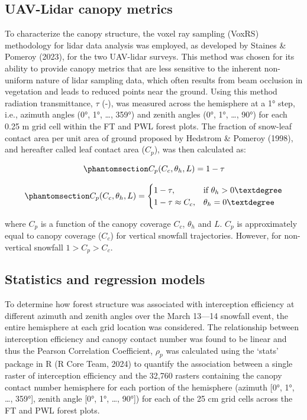 \documentclass[
  letterpaper,
  DIV=11,
  numbers=noendperiod]{scrartcl}
\begin{document}
\subsection{UAV-Lidar canopy metrics}\label{uav-lidar-canopy-metrics}

To characterize the canopy structure, the voxel ray sampling (VoxRS)
methodology for lidar data analysis was employed, as developed by
Staines \& Pomeroy (2023), for the two UAV-lidar surveys. This method
was chosen for its ability to provide canopy metrics that are less
sensitive to the inherent non-uniform nature of lidar sampling data,
which often results from beam occlusion in vegetation and leads to
reduced points near the ground. Using this method radiation
transmittance, \(\tau\) (-), was measured across the hemisphere at a 1°
step, i.e., azimuth angles (0°, 1°, \ldots, 359°) and zenith angles (0°,
1°, \ldots, 90°) for each 0.25 m grid cell within the FT and PWL forest
plots. The fraction of snow-leaf contact area per unit area of ground
proposed by Hedstrom \& Pomeroy (1998), and hereafter called leaf
contact area (\(C_p\)), was then calculated as:

\begin{equation}\phantomsection\label{eq-lca}{
C_p(C_c, \theta_h, L) = 1-\tau
}\end{equation}

\begin{equation}\phantomsection\label{eq-tf-ode}{
C_p(C_c, \theta_h, L) = \begin{cases}
    1-\tau,& \text{if } \theta_h> 0°\\
    1-\tau \approx C_c ,              & \theta_h= 0°
\end{cases}
}\end{equation}

where \(C_p\) is a function of the canopy coverage \(C_c\), \(\theta_h\)
and \(L\). \(C_p\) is approximately equal to canopy coverage (\(C_c\))
for vertical snowfall trajectories. However, for non-vertical snowfall
\(1 > C_p > C_c\).

\subsection{Statistics and regression
models}\label{statistics-and-regression-models}

To determine how forest structure was associated with interception
efficiency at different azimuth and zenith angles over the March 13---14
snowfall event, the entire hemisphere at each grid location was
considered. The relationship between interception efficiency and canopy
contact number was found to be linear and thus the Pearson Correlation
Coefficient, \(\rho_p\) was calculated using the `stats' package in R (R
Core Team, 2024) to quantify the association between a single raster of
interception efficiency and the 32,760 rasters containing the canopy
contact number hemisphere for each portion of the hemisphere (azimuth
{[}0°, 1°, \ldots, 359°{]}, zenith angle {[}0°, 1°, \ldots, 90°{]}) for
each of the 25 cm grid cells across the FT and PWL forest plots.
\end{document}
